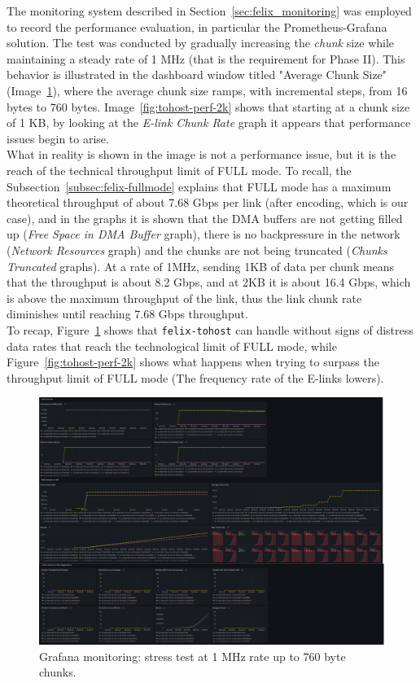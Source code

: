 The monitoring system described in Section~\ref{sec:felix_monitoring} was employed to record the performance evaluation, in particular the Prometheus-Grafana solution. The test was conducted by gradually increasing the \emph{chunk} size while maintaining a steady rate of 1 MHz (that is the requirement for Phase II). This behavior is illustrated in the dashboard window titled "Average Chunk Size" (Image~\ref{fig:tohost-perf-760B}), where the average chunk size ramps, with incremental steps, from 16 bytes to 760 bytes. Image~\ref{fig:tohost-perf-2k} shows that starting at a chunk size of 1 KB, by looking at the \emph{E-link Chunk Rate} graph it appears that performance issues begin to arise.\\
What in reality is shown in the image is not a performance issue, but it is the reach of the technical throughput limit of FULL mode. To recall, the Subsection~\ref{subsec:felix-fullmode} explains that FULL mode has a maximum theoretical throughput of about 7.68 Gbps per link (after encoding, which is our case), and in the graphs it is shown that the \acs{DMA} buffers are not getting filled up (\emph{Free Space in DMA Buffer} graph), there is no backpressure in the network (\emph{Network Resources} graph) and the chunks are not being truncated (\emph{Chunks Truncated} graphs). At a rate of 1MHz, sending 1KB of data per chunk means that the throughput is about 8.2 Gbps, and at 2KB it is about 16.4 Gbps, which is above the maximum throughput of the link, thus the link chunk rate diminishes until reaching 7.68 Gbps throughput.\\ 
To recap, Figure~\ref{fig:tohost-perf-760B} shows that \texttt{felix-tohost} can handle without signs of distress data rates that reach the technological limit of FULL mode, while Figure~\ref{fig:tohost-perf-2k} shows what happens when trying to surpass the throughput limit of FULL mode (The frequency rate of the \acs{E-link}s lowers).

\begin{figure}[htbp]
\centering
\includegraphics[width=\textwidth]{images/results/tohost-perf-760B.png}
\caption{Grafana monitoring: stress test at 1 MHz rate up to 760 byte chunks.}
\label{fig:tohost-perf-760B}
\end{figure}

